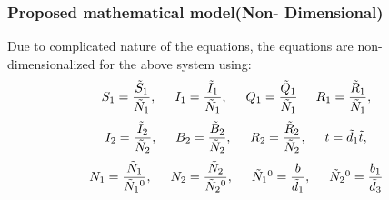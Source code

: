 \documentclass{beamer}
\begin{document}

\begin{frame}\frametitle{Proposed mathematical model(Non- Dimensional)}
Due to complicated nature of the equations, the equations are non-dimensionalized for the above system using:
\small
\begin{equation*}
S_1=\frac{ \tilde S_1}{ \tilde N_1}, \hspace{0.5 cm} I_1=\frac{ \tilde I_1}{ \tilde N_1}, \hspace{0.5 cm} Q_1=\frac{ \tilde Q_1}{ \tilde N_1} \hspace{0.5 cm}
R_1=\frac{ \tilde R_1}{\tilde N_1},\end{equation*}
\small \begin{equation*}I_2=\frac{ \tilde I_2}{\tilde N_2},  \hspace{0.5 cm} B_2=\frac{\tilde B_2}{\tilde N_2},  \hspace{0.5 cm} R_2=\frac{\tilde R_2}{\tilde N_2}, \hspace{0.5 cm} t=\tilde d_1 \tilde t,\end{equation*}
\small\begin{equation*} N_1=\frac{\tilde N_1}{ \tilde N_1\textsuperscript{0}},  \hspace{0.5 cm} N_2=\frac{\tilde N_2}{ \tilde N_2\textsuperscript{0}},  \hspace{0.5 cm} \tilde N_1\textsuperscript{0}=\frac{b}{\tilde d_1},  \hspace{0.5 cm} \tilde N_2\textsuperscript{0}=\frac{b_1}{\tilde d_3}
\end{equation*}
\end{frame}
\end{document}
